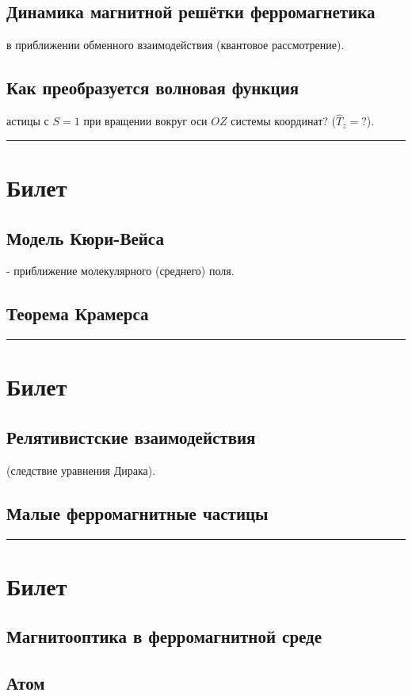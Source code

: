 \documentclass[a4paper, 14pt, russian]{article}
\newcommand{\ihline}{\noindent\rule{\textwidth}{1pt}}
\begin{document}
		\subsection{Динамика магнитной решётки ферромагнетика}
		в приближении обменного взаимодействия (квантовое рассмотрение).
		\subsection{Как преобразуется волновая функция}
		астицы с $S = 1$ при вращении вокруг оси $OZ$ системы координат?
		($\hat{T}_z = ?$).

	\ihline

	\section{Билет}
		\subsection{Модель Кюри-Вейса}
		- приближение молекулярного (среднего) поля.
		\subsection{Теорема Крамерса}
		
	\ihline

	\section{Билет}
		\subsection{Релятивистские взаимодействия}
		(следствие уравнения Дирака).
		\subsection{Малые ферромагнитные частицы}

	\ihline

	\section{Билет}
		\subsection{Магнитооптика в ферромагнитной среде}
		\subsection{Атом}
\end{document}
